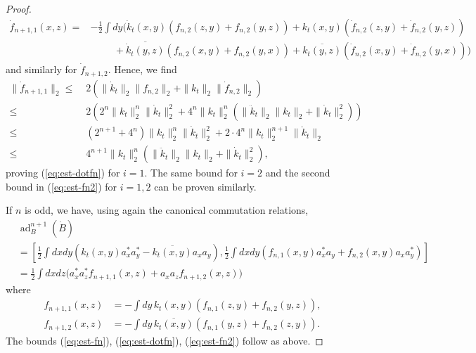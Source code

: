 \documentclass[11pt,a4paper]{article}
\newcommand{\ad}{\operatorname{ad}}	%
\newcommand{\di}{{d}}		%
\newcommand{\cc}[1]{\overline{#1}}	%
\begin{document}
\begin{proof}
\[\begin{split}
\dot{f}_{n+1,1}(x,z) = &-\frac{1}{2} \int \di y \Big( \dot{k}_t (x,y) \left( f_{n,2}(z,y) + f_{n,2}(y,z) \right) + k_t (x,y) \left( \dot{f}_{n,2} (z,y) + \dot{f}_{n,2} (y,z) \right) \\ &\hspace{1cm} + \cc{\dot{k}_t (y,z)} \left( f_{n,2}(x,y) + f_{n,2}(y,x)\right) + \cc{k_t (y,z)} \left( \dot{f}_{n,2}(x,y) + \dot{f}_{n,2}(y,x)\right) \Big) \end{split}\]
and similarly for $\dot{f}_{n+1,2}$. Hence, we find
\[ \begin{split} 
\| \dot{f}_{n+1,1} \|_2 \leq \; &2 \left( \| \dot{k}_t \|_2 \| f_{n,2} \|_2 + \| k_t \|_2 \| \dot{f}_{n,2} \|_2 \right)  \\
\leq \; & 2 \left( 2^n \| k_t \|_2^n \| \dot{k}_t \|_2^2 + 4^n \| k_t \|_2^n \left( \| \ddot k_t \|_2 \| k_t \|_2 + \| \dot k_t \|_2^2 \right) \right) \\
\leq \; & (2^{n+1} + 4^n) \| k_t \|_2^n \| \dot k_t \|_2^2 + 2 \cdot 4^n \| k_t \|_2^{n+1} \| \ddot k_t \|_2 \\ \leq \; & 4^{n+1} \| k_t \|_2^n \left( \| \ddot k_t \|_2 \| k_t \|_2 + \| \dot k_t \|_2^2 \right),
\end{split} \]
proving (\ref{eq:est-dotfn}) for $i = 1$. The same bound for $i=2$ and the second bound in (\ref{eq:est-fn2}) for $i=1,2$ can be proven similarly. 

If $n$ is odd, we have, using again the canonical commutation relations, 
\begin{align*}
& \ad^{n+1}_B(\dot B)\\
& = \left[ \frac{1}{2}\int \di x \di y \left( k_t (x,y)a^\ast_x a^\ast_y - \cc{k_t (x,y)} a_x a_y \right) , \frac{1}{2}\int \di x\di y \left( f_{n,1}(x,y) a^\ast_x a_y + f_{n,2}(x,y) a_x a^\ast_y \right) \right] \\
& = \frac{1}{2} \int \di x\di z \big( a^\ast_x a^\ast_z f_{n+1,1}(x,z) + a_x a_z f_{n+1,2}(x,z) \big)
\end{align*}
where
\begin{equation}
\label{eq:odd}
\begin{split}
f_{n+1,1}(x,z) & = - \int \di y\, k_t (x,y)\left( f_{n,1}(z,y) +
f_{n,2}(y,z) \right), \\
f_{n+1,2}(x,z) & = - \int \di y\, \cc{k_t (x,y)}\left( f_{n,1}(y,z) + f_{n,2}(z,y) \right).
\end{split}
\end{equation}
The bounds (\ref{eq:est-fn}), (\ref{eq:est-dotfn}), (\ref{eq:est-fn2}) follow as above.
\end{proof}
\end{document}
